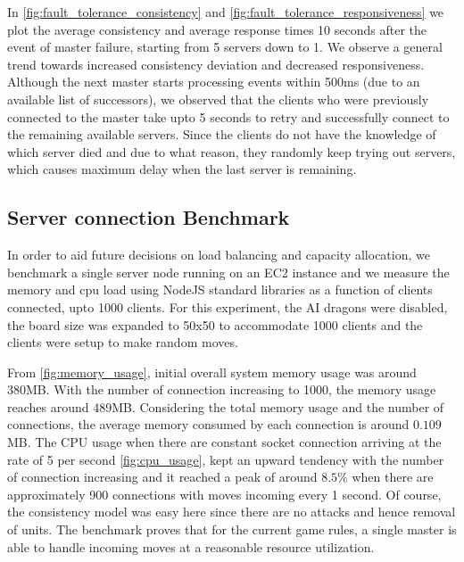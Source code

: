 \documentclass[a4paper]{IEEEtran}
\begin{document}
  In \autoref{fig:fault_tolerance_consistency} and \autoref{fig:fault_tolerance_responsiveness} we plot the average consistency and average response times 10 seconds after the event of master failure, starting from 5 servers down to 1. We observe a general trend towards increased consistency deviation and decreased responsiveness. Although the next master starts processing events within 500ms (due to an available list of successors), we observed that the clients who were previously connected to the master take upto 5 seconds to retry and successfully connect to the remaining available servers. Since the clients do not have the knowledge of which server died and due to what reason, they randomly keep trying out servers, which causes maximum delay when the last server is remaining.

  \subsection{Server connection Benchmark}

  In order to aid future decisions on load balancing and capacity allocation, we benchmark a single server node running on an EC2 instance and we measure the memory and cpu load using NodeJS standard libraries as a function of clients connected, upto 1000 clients. For this experiment, the AI dragons were disabled, the board size was expanded to 50x50 to accommodate 1000 clients and the clients were setup to make random moves.
  
  From \autoref{fig:memory_usage}, initial overall system memory usage was around 380MB. With the number of connection increasing to 1000, the memory usage reaches around 489MB. Considering the total memory usage and the number of connections, the average memory consumed by each connection is around $0.109$ MB. The CPU usage when there are constant socket connection arriving at the rate of 5 per second \autoref{fig:cpu_usage}, kept an upward tendency with the number of connection increasing and it reached a peak of around $8.5\%$ when there are approximately 900 connections with moves incoming every 1 second. Of course, the consistency model was easy here since there are no attacks and hence removal of units. The benchmark proves that for the current game rules, a single master is able to handle incoming moves at a reasonable resource utilization.
\end{document}

